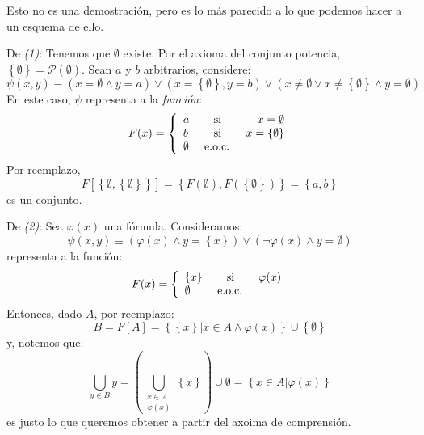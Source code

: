 \documentclass[12pt]{report}
\newcounter{it}
\theoremstyle{largebreak}
\newcommand\pot[1]{\ensuremath{\mathcal{P}\left(#1\right)}}
\begin{document}
    \begin{sol}
        Esto no es una demostración, pero es lo más parecido a lo que podemos hacer a un esquema de ello.
        
        De \textit{(1)}: Tenemos que $\emptyset$ existe. Por el axioma del conjunto potencia, $\left\{\emptyset\right\}=\pot{\emptyset}$. Sean $a$ y $b$ arbitrarios, considere:
        \begin{equation*}
            \psi(x,y)\equiv(x=\emptyset\land y=a)\lor(x=\left\{\emptyset \right\},y=b)\lor(x\neq\emptyset\lor x\neq\left\{\emptyset \right\}\land y = \emptyset)
        \end{equation*}
        En este caso, $\psi$ representa a la \textit{función}:
        \begin{equation*}
            F(x)=\left\{
                \begin{array}{lcr}
                    a & \textup{ si } & x=\emptyset \\
                    b & \textup{ si } & x=\left\{\emptyset\right\} \\
                    \emptyset & \textup{ e.o.c. } & \\
                \end{array}
            \right.
        \end{equation*}
        Por reemplazo,
        \begin{equation*}
            F[\left\{\emptyset,\left\{\emptyset \right\} \right\}]=\left\{F(\emptyset),F(\left\{\emptyset\right\})\right\}=\left\{a,b\right\}
        \end{equation*}
        es un conjunto.

        De \textit{(2)}: Sea $\varphi(x)$ una fórmula. Consideramos:
        \begin{equation*}
            \psi(x,y)\equiv(\varphi(x)\land y =\left\{x \right\})\lor(\neg\varphi(x)\land y=\emptyset)
        \end{equation*}
        representa a la función:
        \begin{equation*}
            F(x)=\left\{ 
                \begin{array}{lcr}
                    \left\{x\right\} & \textup{ si } & \varphi(x) \\
                    \emptyset & \textup{ e.o.c. } & \\
                \end{array}
            \right.
        \end{equation*}
        Entonces, dado $A$, por reemplazo:
        \begin{equation*}
            B=F[A]=\left\{\left\{x\right\}\Big|x\in A\land\varphi(x) \right\}\cup\left\{\emptyset\right\}
        \end{equation*}
        y, notemos que:
        \begin{equation*}
            \bigcup_{ y\in B}y=\left(\bigcup_{\substack{x\in A \\ \varphi(x)}}\left\{x\right\}\right)\cup\emptyset=\left\{x\in A\Big|\varphi(x) \right\}
        \end{equation*}
        es justo lo que queremos obtener a partir del axoima de comprensión.
    \end{sol}
\end{document}
